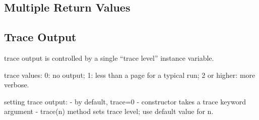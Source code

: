 \documentclass{article}
\begin{document}
\subsection{Multiple Return Values}

\subsection{Trace Output}

trace output is controlled by a single ``trace level'' instance
variable.

trace values: 0: no output; 1: less than a page for a typical run; 2
or higher: more verbose.

setting trace output:
      - by default, trace=0
      - constructor takes a trace keyword argument
      - trace(n) method sets trace level; use default value for n.
\end{document}
